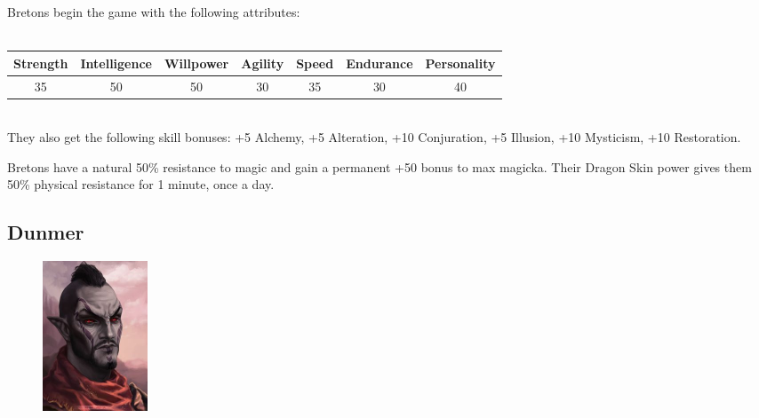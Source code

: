 \documentclass[12pt]{book}
\begin{document}
Bretons begin the game with the following attributes:\\~\\
\begin{tabular}{|c|c|c|c|c|c|c|}
\hline
Strength & Intelligence & Willpower & Agility & Speed & Endurance & Personality\\ \hline
35 & 50 & 50 & 30 & 35 & 30 & 40\\ \hline

\end{tabular}\\

They also get the following skill bonuses: +5 Alchemy, +5 Alteration, +10 Conjuration, +5 Illusion, +10 Mysticism, +10 Restoration.

Bretons have a natural 50\% resistance to magic and gain a permanent +50 bonus to max magicka. Their Dragon Skin power gives them 50\% physical resistance for 1 minute, once a day.\\

\subsection{Dunmer}
\begin{figure}
	\includegraphics[width=\textwidth]{Dunmer.png}
\end{figure}
\end{document}
